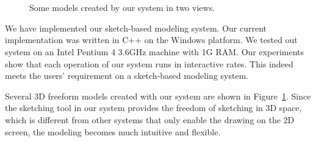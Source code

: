 \begin{figure} [htbp]
\renewcommand{\thesubfigure}{}
  \centering
    \\
    \\
  \caption{Some models created by our system in two views.}
  \label{fig:results} %
\end{figure}

We have implemented our sketch-based modeling system. Our current implementation was written in C++ on the Windows platform. We tested out system on an Intel Pentium 4 3.6GHz machine with 1G RAM. Our experiments show that each operation of our system runs in interactive rates. This indeed meets the users' requirement on a sketch-based modeling system.

Several 3D freeform models created with our system are shown in Figure~\ref{fig:results}. Since the sketching tool in our system provides the freedom of sketching in 3D space, which is different from other systems that only enable the drawing on the 2D screen, the modeling becomes much intuitive and flexible.

